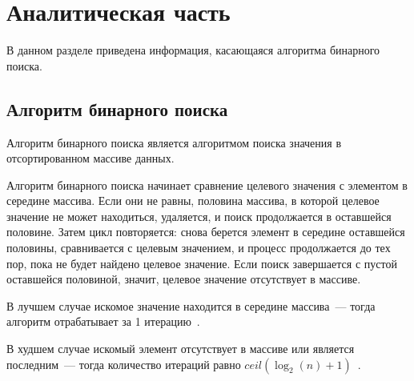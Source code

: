 \chapter{Аналитическая часть}

В данном разделе приведена информация, касающаяся алгоритма бинарного поиска.

\section{Алгоритм бинарного поиска}

Алгоритм бинарного поиска является алгоритмом поиска значения в отсортированном массиве данных.

Алгоритм бинарного поиска начинает сравнение целевого значения с элементом в середине массива.
Если они не равны, половина массива, в которой целевое значение не может находиться, удаляется, и поиск продолжается в оставшейся половине.
Затем цикл повторяется: снова берется элемент в середине оставшейся половины, сравнивается с целевым значением, и процесс продолжается до тех пор, пока не будет найдено целевое значение.
Если поиск завершается с пустой оставшейся половиной, значит, целевое значение отсутствует в массиве.

В лучшем случае искомое значение находится в середине массива~--- тогда алгоритм отрабатывает за 1 итерацию~\cite{bin-search-best}.

В худшем случае искомый элемент отсутствует в массиве или является последним~--- тогда количество итераций равно $ceil(\log_2(n) + 1)$~\cite{bin-search-worst}.